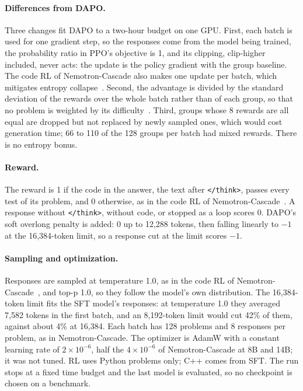 \documentclass[sigconf,nonacm,balance=false]{acmart}
\begin{document}
\paragraph{Differences from DAPO\@.} Three changes fit DAPO to a two-hour budget on one GPU. First, each batch is used
for one gradient step, so the responses come from the model being trained, the probability ratio in PPO's objective is
1, and its clipping, clip-higher included, never acts: the update is the policy gradient with the group baseline.
The code RL of Nemotron-Cascade also makes one update per batch, which mitigates entropy
collapse~\cite{wang2025nemotroncascade}. Second, the advantage is
divided by the standard deviation of the rewards over the whole batch rather than of each group, so that no problem
is weighted by its difficulty~\cite{liu2025tricks}. Third, groups whose 8 rewards are all equal are dropped but not
replaced by newly sampled ones, which would cost generation time; 66 to 110 of the 128 groups per batch had mixed
rewards. There is no entropy bonus.

\paragraph{Reward.} The reward is 1 if the code in the answer, the text after \texttt{</think>}, passes every test of
its problem, and 0 otherwise, as in the code RL of Nemotron-Cascade~\cite{wang2025nemotroncascade}. A response
without \texttt{</think>}, without code, or stopped as a loop scores 0. DAPO's soft overlong penalty is added: 0 up to
12,288 tokens, then falling linearly to $-1$ at the 16,384-token limit, so a response cut at the limit scores $-1$.

\paragraph{Sampling and optimization.} Responses are sampled at temperature 1.0, as in the code RL of
Nemotron-Cascade~\cite{wang2025nemotroncascade}, and top-p 1.0, so they follow the model's own distribution. The
16,384-token limit fits the SFT model's responses: at temperature 1.0 they averaged 7,582 tokens in the first batch,
and an 8,192-token limit would cut 42\% of them, against about 4\% at 16,384. Each batch has 128 problems and 8
responses per problem, as in Nemotron-Cascade. The optimizer is AdamW with a constant learning rate of
$2 \times 10^{-6}$, half the $4 \times 10^{-6}$ of Nemotron-Cascade at 8B and 14B; it was not tuned. RL uses Python
problems only; C++ comes from SFT\@. The run stops at a fixed time budget and the last model is evaluated, so no
checkpoint is chosen on a benchmark.
\end{document}
